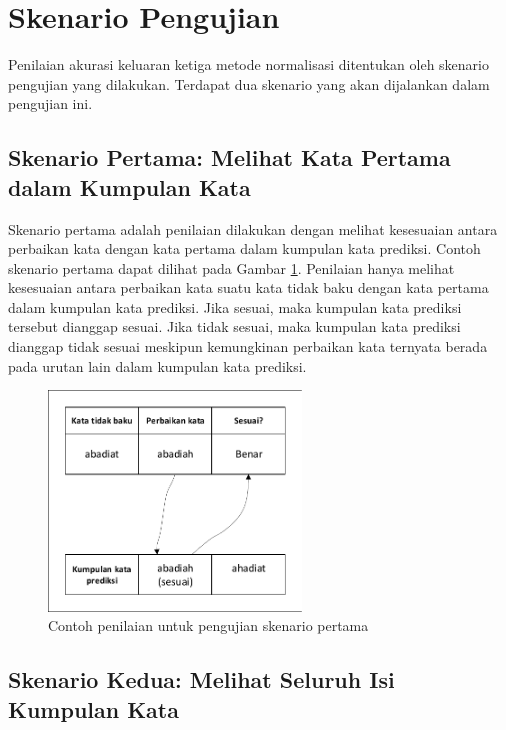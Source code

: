 \section{Skenario Pengujian}

Penilaian akurasi keluaran ketiga metode normalisasi ditentukan oleh skenario pengujian yang dilakukan. Terdapat dua skenario yang akan dijalankan dalam pengujian ini.

\subsection{Skenario Pertama: Melihat Kata Pertama dalam Kumpulan Kata}

Skenario pertama adalah penilaian dilakukan dengan melihat kesesuaian antara perbaikan kata dengan kata pertama dalam kumpulan kata prediksi. Contoh skenario pertama dapat dilihat pada Gambar \ref{fig:skenario1_eg}. Penilaian hanya melihat kesesuaian antara perbaikan kata suatu kata tidak baku dengan kata pertama dalam kumpulan kata prediksi. Jika sesuai, maka kumpulan kata prediksi tersebut dianggap sesuai. Jika tidak sesuai, maka kumpulan kata prediksi dianggap tidak sesuai meskipun kemungkinan perbaikan kata ternyata berada pada urutan lain dalam kumpulan kata prediksi.
\begin{figure}[ht]
	\centering
	\includegraphics[width=0.6\textwidth, trim=2 2 2 2, clip]{resources/4/skenario1_eg.pdf}
	\caption{Contoh penilaian untuk pengujian skenario pertama}
	\label{fig:skenario1_eg}
\end{figure}

\subsection{Skenario Kedua: Melihat Seluruh Isi Kumpulan Kata}

